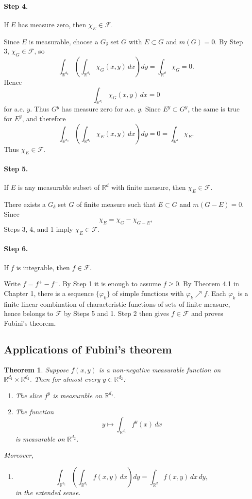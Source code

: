\documentclass[11pt,openany]{book}
\newtheorem{theorem}{Theorem}[section]
\begin{document}
\paragraph{Step 4.} If $E$ has measure zero, then $\chi_E\in\mathcal{F}$.

Since $E$ is measurable, choose a $G_\delta$ set $G$ with $E\subset G$ and $m(G)=0$. By Step 3, $\chi_G\in\mathcal{F}$, so
\[
\int_{\mathbb{R}^{d_2}}
\left(\int_{\mathbb{R}^{d_1}}\chi_G(x,y)\,dx\right)dy
=\int_{\mathbb{R}^d}\chi_G=0.
\]
Hence
\[
\int_{\mathbb{R}^{d_1}}\chi_G(x,y)\,dx=0
\]
for a.e. $y$. Thus $G^y$ has measure zero for a.e. $y$. Since $E^y\subset G^y$, the same is true for $E^y$, and therefore
\[
\int_{\mathbb{R}^{d_2}}
\left(\int_{\mathbb{R}^{d_1}}\chi_E(x,y)\,dx\right)dy
=0
=\int_{\mathbb{R}^d}\chi_E.
\]
Thus $\chi_E\in\mathcal{F}$.

\paragraph{Step 5.} If $E$ is any measurable subset of $\mathbb{R}^d$ with finite measure, then $\chi_E\in\mathcal{F}$.

There exists a $G_\delta$ set $G$ of finite measure such that $E\subset G$ and $m(G-E)=0$. Since
\[
\chi_E=\chi_G-\chi_{G-E},
\]
Steps 3, 4, and 1 imply $\chi_E\in\mathcal{F}$.

\paragraph{Step 6.} If $f$ is integrable, then $f\in\mathcal{F}$.

Write $f=f^+-f^-$. By Step 1 it is enough to assume $f\geq0$. By Theorem 4.1 in Chapter 1, there is a sequence $\{\varphi_k\}$ of simple functions with $\varphi_k\nearrow f$. Each $\varphi_k$ is a finite linear combination of characteristic functions of sets of finite measure, hence belongs to $\mathcal{F}$ by Steps 5 and 1. Step 2 then gives $f\in\mathcal{F}$ and proves Fubini's theorem.

\subsection{Applications of Fubini's theorem}

\begin{theorem}
Suppose $f(x,y)$ is a non-negative measurable function on $\mathbb{R}^{d_1}\times\mathbb{R}^{d_2}$. Then for almost every $y\in\mathbb{R}^{d_2}$:
\begin{enumerate}
\item[(i)] The slice $f^y$ is measurable on $\mathbb{R}^{d_1}$.
\item[(ii)] The function
\[
y\longmapsto\int_{\mathbb{R}^{d_1}}f^y(x)\,dx
\]
is measurable on $\mathbb{R}^{d_2}$.
\end{enumerate}
Moreover,
\begin{enumerate}
\item[(iii)]
\[
\int_{\mathbb{R}^{d_2}}
\left(\int_{\mathbb{R}^{d_1}}f(x,y)\,dx\right)dy
=\int_{\mathbb{R}^d}f(x,y)\,dx\,dy,
\]
in the extended sense.
\end{enumerate}
\end{theorem}
\end{document}
